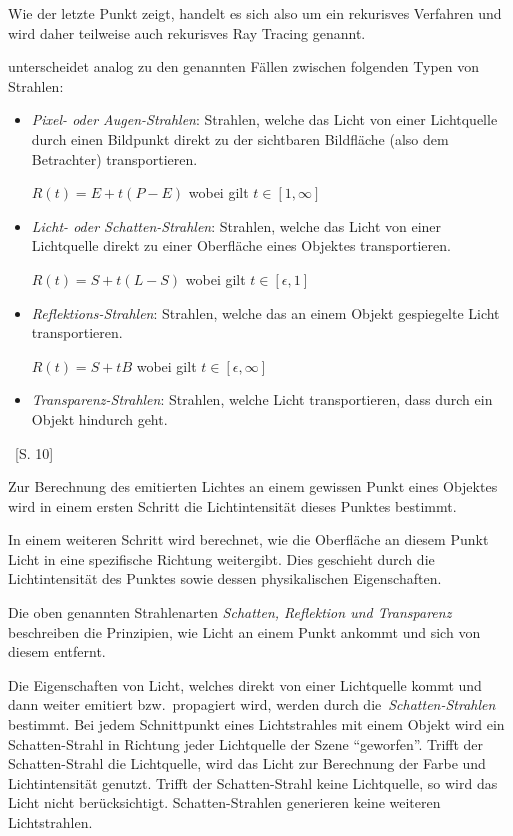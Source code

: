 Wie der letzte Punkt zeigt, handelt es sich also um ein rekurisves Verfahren
und wird daher teilweise auch rekurisves Ray Tracing genannt.

\citeauthor{glassner_introduction_1989} unterscheidet analog zu den
genannten Fällen zwischen folgenden Typen von Strahlen:
\begin{itemize}
    \item{\textit{Pixel- oder Augen-Strahlen}:} Strahlen, welche das Licht von
        einer Lichtquelle durch einen Bildpunkt direkt zu der sichtbaren
        Bildfläche (also dem Betrachter) transportieren.

        $R(t) = E + t(P - E)$ wobei gilt $t \in [1, \infty]$

    \item{\textit{Licht- oder Schatten-Strahlen}:} Strahlen, welche das Licht von
        einer Lichtquelle direkt zu einer Oberfläche eines Objektes
        transportieren.

        $R(t) = S + t(L - S)$ wobei gilt $t \in [\epsilon, 1]$

    \item{\textit{Reflektions-Strahlen}:} Strahlen, welche das an einem
        Objekt gespiegelte Licht transportieren.

        $R(t) = S + tB$ wobei gilt $t \in [\epsilon, \infty]$

    \item{\textit{Transparenz-Strahlen}:} Strahlen, welche Licht
        transportieren, dass durch ein Objekt hindurch geht.
\end{itemize}~\cite{glassner_introduction_1989}[S. 10]

Zur Berechnung des emitierten Lichtes an einem gewissen Punkt eines Objektes
wird in einem ersten Schritt die Lichtintensität dieses Punktes
bestimmt.

In einem weiteren Schritt wird berechnet, wie die Oberfläche an diesem
Punkt Licht in eine spezifische Richtung weitergibt.  Dies geschieht
durch die Lichtintensität des Punktes sowie dessen physikalischen
Eigenschaften. 

Die oben genannten Strahlenarten \textit{Schatten, Reflektion und
    Transparenz} beschreiben die Prinzipien, wie Licht an einem Punkt
ankommt und sich von diesem entfernt.

Die Eigenschaften von Licht, welches direkt von einer Lichtquelle kommt
und dann weiter emitiert bzw.\ propagiert wird, werden durch
die~\textit{Schatten-Strahlen} bestimmt. Bei jedem Schnittpunkt eines
Lichtstrahles mit einem Objekt wird ein Schatten-Strahl in Richtung jeder
Lichtquelle der Szene ``geworfen''. Trifft der Schatten-Strahl die
Lichtquelle, wird das Licht zur Berechnung der Farbe und Lichtintensität
genutzt. Trifft der Schatten-Strahl keine Lichtquelle, so wird das Licht
nicht berücksichtigt. Schatten-Strahlen generieren keine weiteren
Lichtstrahlen.

